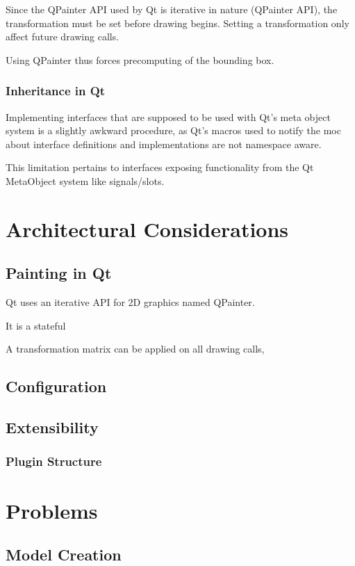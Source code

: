 Since the \gls{QPainter} API used by Qt is iterative in nature (\gls{QPainter} API), the transformation must be set before drawing begins. Setting a transformation only affect future drawing calls.

Using \gls{QPainter} thus forces precomputing of the bounding box.


\subsubsection{Inheritance in Qt}
Implementing interfaces that are supposed to be used with Qt's meta object system is a slightly awkward procedure, as Qt's macros used to notify the moc about interface definitions and implementations are not namespace aware. 

This limitation pertains to interfaces exposing functionality from the Qt MetaObject system like signals/slots.

\section{Architectural Considerations}

\subsection{Painting in Qt}
Qt uses an iterative API for 2D graphics named QPainter.

It is a stateful 

A transformation matrix can be applied on all drawing calls,

\subsection{Configuration}

\subsection{Extensibility}
\subsubsection{Plugin Structure}

\section{Problems}
\subsection{Model Creation}
